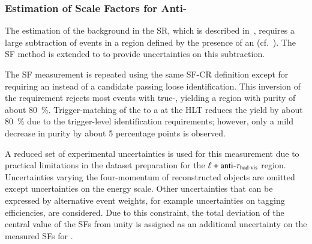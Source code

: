

\subsubsection{Estimation of \Faketauhadvis Scale Factors for Anti-\tauhadvis}

The estimation of the \multijet background in the \hadhad SR, which is described
in~, requires a large subtraction of \ttbarFakes events
in a region defined by the presence of an \antitau
(cf.~). The SF method is extended to \antitau to
provide uncertainties on this subtraction.

The SF measurement is repeated using the same SF-CR definition except for
requiring an \antitau instead of a \tauhadvis candidate passing loose
identification.
This inversion of the \tauid requirement rejects most \ttbar events with
true-\tauhadvis, yielding a region with \ttbarFakes purity of about
\SI{80}{\percent}. Trigger-matching of the \antitau to a \tauhadvis at the HLT
reduces the \ttbarFakes yield by about \SI{80}{\percent} due to the
trigger-level identification requirements; however, only a mild decrease in
\ttbarFakes purity by about 5 percentage points is observed.

A reduced set of experimental uncertainties is used for this measurement due to
practical limitations in the dataset preparation for the
$\ell + \text{anti-}\tau_{\text{had-vis}}$ region. Uncertainties varying the four-momentum
of reconstructed objects are omitted except uncertainties on the \tauhadvis
energy scale. Other uncertainties that can be expressed by alternative event
weights, for example uncertainties on tagging efficiencies, are considered. Due
to this constraint, the total deviation of the central value of the SFs from
unity is assigned as an additional uncertainty on the measured SFs for \antitau.


